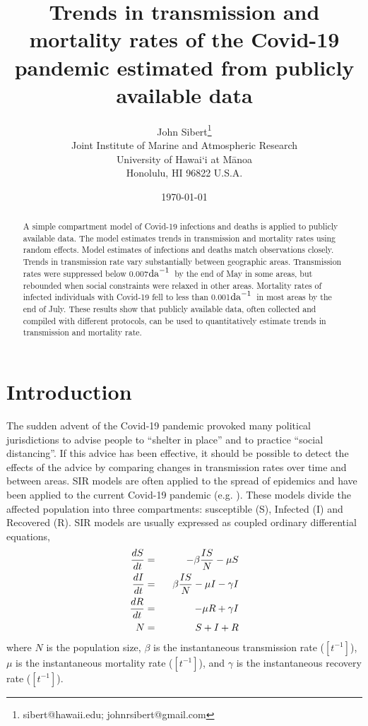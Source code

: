 \documentclass[12pt,letterpaper]{article}
\title{Trends in transmission and mortality rates of the Covid-19
pandemic estimated from publicly available data}
\author{
John Sibert\thanks{sibert@hawaii.edu; johnrsibert@gmail.com}\\
Joint Institute of Marine and Atmospheric Research\\
University of Hawai`i at M\={a}noa\\
Honolulu, HI  96822 U.S.A.\\[0.125in]
\date{\today}
}
\newcommand\doublespacing{\baselineskip=1.6\normalbaselineskip}
\newcommand\perda{$\rm{da}^{-1}$}
\begin{document}
\maketitle

\doublespacing

\begin{abstract}
A simple compartment model of Covid-19 infections and deaths is
applied to publicly available data. 
The model estimates trends in transmission and mortality rates using
random effects.
Model estimates of infections and deaths match observations closely. 
Trends in transmission rate vary substantially between geographic
areas. Transmission rates were suppressed below 0.007\perda\ by the
end of May in some areas, but rebounded when social constraints
were relaxed in other areas.
Mortality rates of infected individuals with Covid-19 fell to less than
0.001\perda\ in most areas by the end of July.
These results show that publicly available data, often collected and
compiled with different protocols, can be used to quantitatively
estimate trends in transmission and mortality rate.
\end{abstract}

\section*{Introduction}

The sudden advent of the Covid-19 pandemic provoked many political
jurisdictions to advise people to ``shelter in place'' and to practice
``social distancing''. If this advice has been effective, it should be
possible to detect the effects of the advice by comparing changes in
transmission rates over time and between areas. 
SIR models are often applied to the spread of epidemics and have
been applied to the current Covid-19 pandemic
(e.g. \cite{Chen2020,Roques2020}).
These models divide the affected population into three
compartments: susceptible (S), Infected (I) and Recovered (R).
SIR models are
usually expressed as coupled ordinary differential equations,
\begin{eqnarray}
\label{eqn:SIR}
\frac{dS}{dt} &=& -\beta\frac{IS}{N} - \mu S\\
\frac{dI}{dt} &=& \hphantom{-}\beta\frac{IS}{N} - \mu I -\gamma I\\
\frac{dR}{dt} &=&  -\mu R +\gamma I\\
N &=& S + I + R
\end{eqnarray}
where $N$ is the population size, $\beta$ is the instantaneous
transmission rate ($[t^{-1}]$), $\mu$ is the instantaneous mortality rate
($[t^{-1}]$),
and $\gamma$ is the instantaneous recovery rate ($[t^{-1}]$).  
\end{document}
